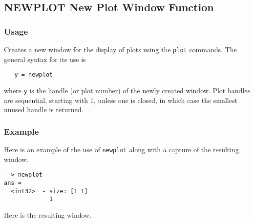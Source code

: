 %
%
%
\subsection{NEWPLOT New Plot Window Function}
\subsubsection{Usage}
Creates a new window for the display of plots using the \verb|plot| commands.
The general syntax for its use is
\begin{verbatim}
   y = newplot
\end{verbatim}
where \verb|y| is the handle (or plot number) of the newly created window.  
Plot handles are sequential, starting with 1, unless one is closed, in 
which case the smallest unused handle is returned.
\subsubsection{Example}
Here is an example of the use of \verb|newplot| along with a capture of the
resulting window.
\begin{verbatim}
--> newplot
ans =
  <int32>  - size: [1 1]
             1
\end{verbatim}
Here is the resulting window.

